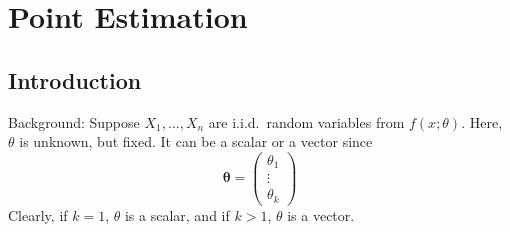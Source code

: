 \chapter{Point Estimation}
\section{Introduction}
Background: Suppose $ X_1,\ldots,X_n $
are i.i.d.\ random variables from
$ f(x;\theta) $. Here, $ \theta $ is unknown, but fixed.
It can be a scalar
or a vector since
\[ \symbf{\theta}=\begin{pmatrix}
            \theta_1 \\
            \vdots   \\
            \theta_k
      \end{pmatrix} \]
Clearly, if $ k=1 $, $ \theta $ is a scalar,
and if $ k>1 $, $ \theta $ is a vector.

